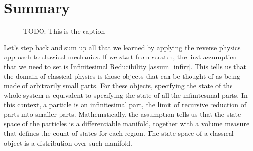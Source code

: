 \section{Summary}
\begin{figure}
	\centering
	\caption {TODO: This is the caption}
\end{figure}
Let's step back and sum up all that we learned by applying the reverse physics approach to classical mechanics. If we start from scratch, the first assumption that we need to set is Infinitesimal Reducibility \ref{assum_infirr}. This tells us that the domain of classical physics is those objects that can be thought of as being made of arbitrarily small parts. For these objects, specifying the state of the whole system is equivalent to specifying the state of all the infinitesimal parts. In this context, a particle is an infinitesimal part, the limit of recursive reduction of parts into smaller parts. Mathematically, the assumption tells us that the state space of the particles is a differentiable manifold, together with a volume measure that defines the count of states for each region. The state space of a classical object is a distribution over such manifold.

